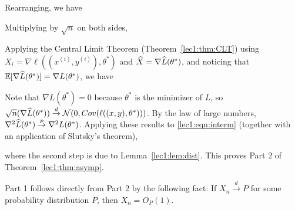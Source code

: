 Rearranging, we have


Multiplying by $\sqrt{n}$ on both sides,

 
Applying the Central Limit Theorem (Theorem~\ref{lec1:thm:CLT}) using $X_i = \nabla \ell ((x^{(i)}, y^{(i)}), \theta^*)$ and $\widehat{X} = \nabla \widehat{L}(\theta^*)$, and noticing that $\mathbb{E}[\nabla \widehat{L}(\theta^{*})] = \nabla L(\theta^{*})$, we have
 
Note that $\nabla L(\theta^{*}) = 0$ because $\theta^{*}$ is the minimizer of  $L$, so $\sqrt{n} (\nabla \widehat{L}(\theta^{*})) \overset{d}{\to} \mathcal{N}(0,Cov(\ell((x, y), \theta^{*})))$. By the law of large numbers, $\nabla^2 \widehat{L}(\theta^*) \stackrel{p}{\rightarrow} \nabla^2 L(\theta^*)$. Applying these results to \eqref{lec1:eqn:interm} (together with an application of Slutsky's theorem),

where the second step is due to Lemma~\ref{lec1:lem:dist}. This proves Part 2 of Theorem~\ref{lec1:thm:asymp}.

Part 1 follows directly from Part 2 by the following fact: If $X_n \stackrel{d}{\rightarrow} P$ for some probability distribution $P$, then $X_n = O_P(1)$.

